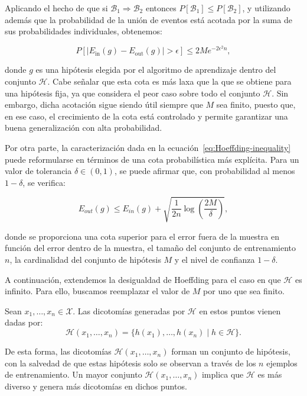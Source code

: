 Aplicando el hecho de que si $\mathcal{B}_1 \Rightarrow \mathcal{B}_2$ entonces $P[\mathcal{B}_1] \leq P[\mathcal{B}_2]$, y utilizando además que la probabilidad de la unión de eventos está acotada por la suma de sus probabilidades individuales, obtenemos:

\begin{equation}\label{eq:Hoeffding-inequality}
    P\left[ \left| E_{\text{in}}(g) - E_{\text{out}}(g) \right| > \epsilon \right] 
    \leq 2M e^{-2\epsilon^2 n},
\end{equation}

donde $g$ es una hipótesis elegida por el algoritmo de aprendizaje dentro del conjunto $\mathcal{H}$. Cabe señalar que esta cota es más laxa que la que se obtiene para una hipótesis fija, ya que considera el peor caso sobre todo el conjunto $\mathcal{H}$. Sin embargo, dicha acotación sigue siendo útil siempre que $M$ sea finito, puesto que, en ese caso, el crecimiento de la cota está controlado y permite garantizar una buena generalización con alta probabilidad.

Por otra parte, la caracterización dada en la ecuación~\eqref{eq:Hoeffding-inequality} puede reformularse en términos de una cota probabilística más explícita. Para un valor de tolerancia $\delta \in (0,1)$, se puede afirmar que, con probabilidad al menos $1 - \delta$, se verifica:

\[
    E_{out}(g) \leq E_{in}(g) + \sqrt{\frac{1}{2n} \log\left(\frac{2M}{\delta}\right)},
\]

donde se proporciona una cota superior para el error fuera de la muestra en función del error dentro de la muestra, el tamaño del conjunto de entrenamiento $n$, la cardinalidad del conjunto de hipótesis $M$ y el nivel de confianza $1 - \delta$.

A continuación, extendemos la desigualdad de Hoeffding para el caso en que $\mathcal{H}$ es infinito. Para ello, buscamos reemplazar el valor de $M$ por uno que sea finito.

\begin{definicion}
    Sean $x_1, \ldots, x_n \in \mathcal{X}$. Las dicotomías generadas por $\mathcal{H}$ en estos puntos vienen dadas por:
    \[
        \mathcal{H}(x_1, \ldots, x_n) = \{ h(x_1), \ldots, h(x_n) \mid h \in \mathcal{H} \}.
    \]
\end{definicion}

De esta forma, las dicotomías $\mathcal{H}(x_1, \ldots, x_n)$ forman un conjunto de hipótesis, con la salvedad de que estas hipótesis solo se observan a través de los $n$ ejemplos de entrenamiento. Un mayor conjunto $\mathcal{H}(x_1, \ldots, x_n)$ implica que $\mathcal{H}$ es más diverso y genera más dicotomías en dichos puntos.

